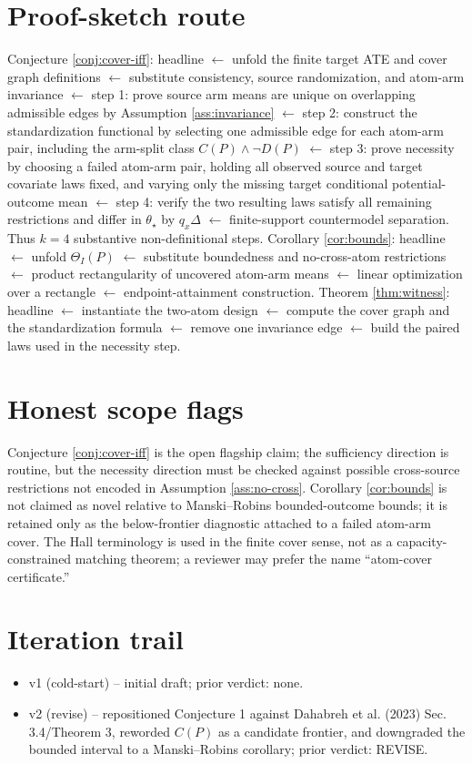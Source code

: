 \documentclass[11pt]{article}
\theoremstyle{definition}
\theoremstyle{plain}
\theoremstyle{remark}
\begin{document}
\section{Proof-sketch route}
Conjecture \ref{conj:cover-iff}: headline $\leftarrow$ unfold the finite target ATE and cover graph definitions $\leftarrow$ substitute consistency, source randomization, and atom-arm invariance $\leftarrow$ step 1: prove source arm means are unique on overlapping admissible edges by Assumption \ref{ass:invariance} $\leftarrow$ step 2: construct the standardization functional by selecting one admissible edge for each atom-arm pair, including the arm-split class $C(P)\wedge\neg D(P)$ $\leftarrow$ step 3: prove necessity by choosing a failed atom-arm pair, holding all observed source and target covariate laws fixed, and varying only the missing target conditional potential-outcome mean $\leftarrow$ step 4: verify the two resulting laws satisfy all remaining restrictions and differ in $\theta_\star$ by $q_x\Delta$ $\leftarrow$ finite-support countermodel separation. Thus $k=4$ substantive non-definitional steps. Corollary \ref{cor:bounds}: headline $\leftarrow$ unfold $\Theta_I(P)$ $\leftarrow$ substitute boundedness and no-cross-atom restrictions $\leftarrow$ product rectangularity of uncovered atom-arm means $\leftarrow$ linear optimization over a rectangle $\leftarrow$ endpoint-attainment construction. Theorem \ref{thm:witness}: headline $\leftarrow$ instantiate the two-atom design $\leftarrow$ compute the cover graph and the standardization formula $\leftarrow$ remove one invariance edge $\leftarrow$ build the paired laws used in the necessity step.

\section{Honest scope flags}
Conjecture \ref{conj:cover-iff} is the open flagship claim; the sufficiency direction is routine, but the necessity direction must be checked against possible cross-source restrictions not encoded in Assumption \ref{ass:no-cross}. Corollary \ref{cor:bounds} is not claimed as novel relative to Manski--Robins bounded-outcome bounds; it is retained only as the below-frontier diagnostic attached to a failed atom-arm cover. The Hall terminology is used in the finite cover sense, not as a capacity-constrained matching theorem; a reviewer may prefer the name ``atom-cover certificate.''

\section{Iteration trail}
\begin{itemize}[leftmargin=*]
\item v1 (cold-start) -- initial draft; prior verdict: none.
\item v2 (revise) -- repositioned Conjecture 1 against Dahabreh et al. (2023) Sec. 3.4/Theorem 3, reworded $C(P)$ as a candidate frontier, and downgraded the bounded interval to a Manski--Robins corollary; prior verdict: REVISE.
\end{itemize}
\end{document}
